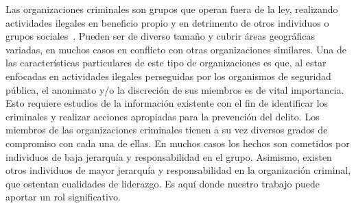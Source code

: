 Las organizaciones criminales son grupos que operan fuera de la ley, realizando actividades ilegales en beneficio propio y en detrimento de otros individuos o grupos sociales~\cite{finckenauer2005problems}. Pueden ser de diverso tamaño y cubrir áreas geográficas variadas, en muchos casos en conflicto con otras organizaciones similares. Una de las características particulares de este tipo de organizaciones es que, al estar enfocadas en actividades ilegales perseguidas por los organismos de seguridad pública, el anonimato y/o la discreción de sus miembros es de vital importancia. Esto requiere estudios de la información existente con el fin de identificar los criminales y realizar acciones apropiadas para la prevención del delito.
Los miembros de las organizaciones criminales tienen a su vez diversos grados de compromiso con cada una de ellas. En muchos casos los hechos son cometidos por individuos de baja jerarquía y responsabilidad en el grupo. Asimismo, existen otros individuos de mayor jerarquía y responsabilidad en la organización criminal, que ostentan cualidades de liderazgo. Es aquí donde nuestro trabajo puede aportar un rol significativo.